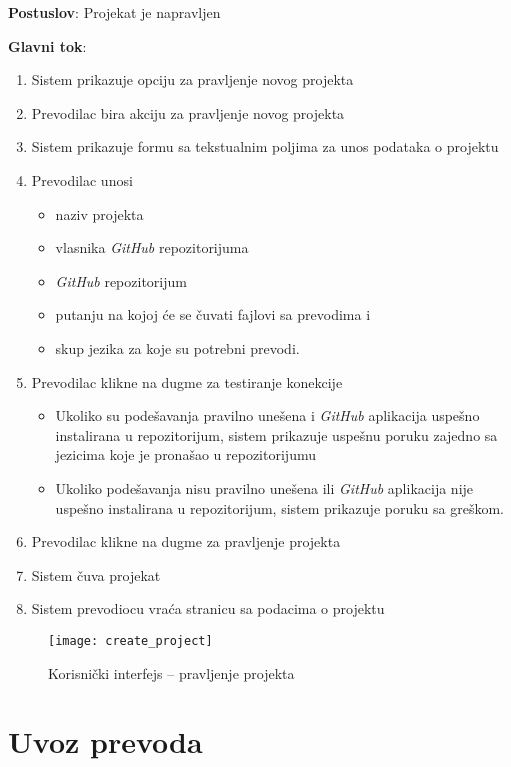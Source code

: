 \textbf{Postuslov}: Projekat je napravljen

\textbf{Glavni tok}:
\begin{enumerate}
    \item Sistem prikazuje opciju za pravljenje novog projekta
    \item Prevodilac bira akciju za pravljenje novog projekta
    \item Sistem prikazuje formu sa tekstualnim poljima za unos podataka o projektu
    \item Prevodilac unosi 
    \begin{itemize}
        \item naziv projekta
        \item vlasnika \textit{GitHub} repozitorijuma
        \item \textit{GitHub} repozitorijum
        \item putanju na kojoj će se čuvati fajlovi sa prevodima i
        \item skup jezika za koje su potrebni prevodi.
    \end{itemize}
    \item Prevodilac klikne na dugme za testiranje konekcije
    \begin{itemize}
        \item Ukoliko su podešavanja pravilno unešena i \textit{GitHub} aplikacija uspešno instalirana u repozitorijum,
        sistem prikazuje uspešnu poruku zajedno sa jezicima koje je pronašao u repozitorijumu
        \item Ukoliko podešavanja nisu pravilno unešena ili \textit{GitHub} aplikacija nije uspešno instalirana u repozitorijum,
        sistem prikazuje poruku sa greškom.
    \end{itemize}
    \item Prevodilac klikne na dugme za pravljenje projekta
    \item Sistem čuva projekat
    \item Sistem prevodiocu vraća stranicu sa podacima o projektu
\end{enumerate}

\begin{figure}[H]
    \centering
    \texttt{[image: create\_project]}
    \caption{Korisnički interfejs -- pravljenje projekta}
\end{figure}


\section{Uvoz prevoda}

